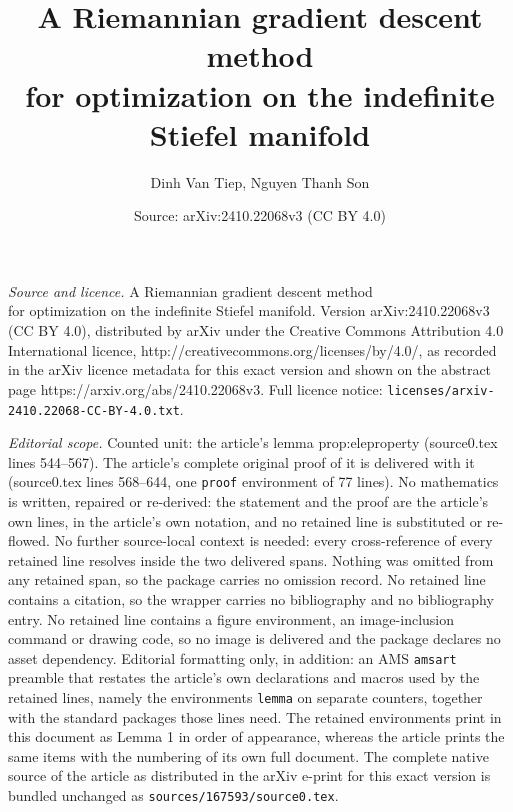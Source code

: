 \documentclass[10pt,a4paper]{amsart}
\title{A Riemannian gradient descent method\\for optimization on the indefinite Stiefel manifold}
\author{Dinh Van Tiep, Nguyen Thanh Son}
\date{Source: arXiv:2410.22068v3 (CC BY 4.0)}
\begin{document}
\maketitle

\noindent\emph{Source and licence.} A Riemannian gradient descent method\\for optimization on the indefinite Stiefel manifold. Version arXiv:2410.22068v3 (CC BY 4.0), distributed by arXiv under the Creative Commons Attribution 4.0 International licence, http://creativecommons.org/licenses/by/4.0/, as recorded in the arXiv licence metadata for this exact version and shown on the abstract page https://arxiv.org/abs/2410.22068v3. Full licence notice: \texttt{licenses/arxiv-2410.22068-CC-BY-4.0.txt}.\par\smallskip

\noindent\textit{Editorial scope.} Counted unit: the article's lemma prop:eleproperty (source0.tex lines 544--567). The article's complete original proof of it is delivered with it (source0.tex lines 568--644, one \texttt{proof} environment of 77 lines). No mathematics is written, repaired or re-derived: the statement and the proof are the article's own lines, in the article's own notation, and no retained line is substituted or re-flowed.  No further source-local context is needed: every cross-reference of every retained line resolves inside the two delivered spans.  Nothing was omitted from any retained span, so the package carries no omission record.  No retained line contains a citation, so the wrapper carries no bibliography and no bibliography entry.  No retained line contains a figure environment, an image-inclusion command or drawing code, so no image is delivered and the package declares no asset dependency.  Editorial formatting only, in addition: an AMS \texttt{amsart} preamble that restates the article's own declarations and macros used by the retained lines, namely the environments \texttt{lemma} on separate counters, together with the standard packages those lines need.  The retained environments print in this document as Lemma 1 in order of appearance, whereas the article prints the same items with the numbering of its own full document.  The complete native source of the article as distributed in the arXiv e-print for this exact version is bundled unchanged as \texttt{sources/167593/source0.tex}.
\end{document}
